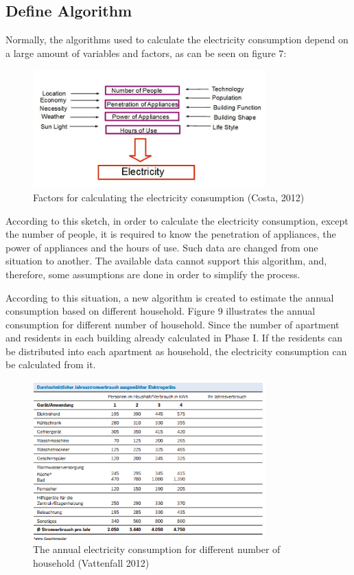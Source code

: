 \subsection{Define Algorithm}

Normally, the algorithms used to calculate the electricity consumption depend on a large amount of variables and factors, as can be seen on figure 7: \citep{costa2012} \\

\begin{figure}[htb!]
	\centering
	\includegraphics[width=0.8\textwidth]{phase2/group3/fig8.png}
	\caption{Factors for calculating the electricity consumption (Costa, 2012) }
	\label{fig:figure8}
\end{figure}

According to this sketch, in order to calculate the electricity consumption, except the number of people, it is required to know the penetration of appliances, the power of appliances and the hours of use. Such data are changed from one situation to another. The available data cannot support this algorithm, and, therefore, some assumptions are done in order to simplify the process.

According to this situation, a new algorithm is created to estimate the annual consumption based on different household. Figure 9 illustrates the annual consumption for different number of household. Since the number of apartment and residents in each building already calculated in Phase I. If  the residents can be distributed into each apartment as household, the electricity consumption can be calculated from it.

\begin{figure}[H]
	\centering
	\includegraphics[width=0.8\textwidth]{phase2/group3/fig9.png}
	\caption{The annual electricity consumption for different number of household (Vattenfall 2012) }
	\label{fig:figure9}
\end{figure}

